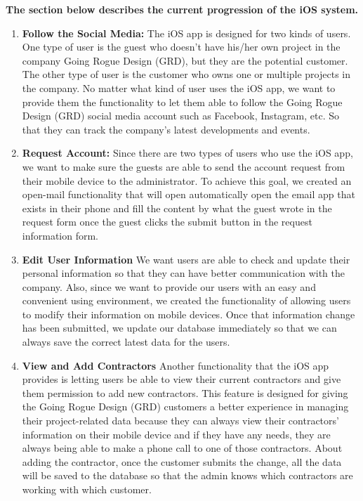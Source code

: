 \documentclass[onecolumn, draftclsnofoot,10pt, compsoc]{IEEEtran}
\begin{document}
\begin{flushleft}
\textbf{The section below describes the current progression of the iOS system.}

\end{flushleft}

\begin{enumerate}
  \item\textbf{ Follow the Social Media:}\newline
  The iOS app is designed for two kinds of users. One type of user is the guest who doesn't have his/her own project in the company Going Rogue Design (GRD), but they are the potential customer. The other type of user is the customer who owns one or multiple projects in the company. No matter what kind of user uses the iOS app, we want to provide them the functionality to let them able to follow the Going Rogue Design (GRD) social media account such as Facebook, Instagram, etc. So that they can track the company's latest developments and events.\newline
  \item \textbf{Request Account:}\newline
  Since there are two types of users who use the iOS app, we want to make sure the guests are able to send the account request from their mobile device to the administrator. To achieve this goal, we created an open-mail functionality that will open automatically open the email app that exists in their phone and fill the content by what the guest wrote in the request form once the guest clicks the submit button in the request information form.\newline
  
  
  \item \textbf{Edit User Information}\newline
  We want users are able to check and update their personal information so that they can have better communication with the company. Also, since we want to provide our users with an easy and convenient using environment, we created the functionality of allowing users to modify their information on mobile devices. Once that information change has been submitted, we update our database immediately so that we can always save the correct latest data for the users.\newline
  \item \textbf{View and Add Contractors}\newline
  Another functionality that the iOS app provides is letting users be able to view their current contractors and give them permission to add new contractors. This feature is designed for giving the Going Rogue Design (GRD) customers a better experience in managing their project-related data because they can always view their contractors' information on their mobile device and if they have any needs, they are always being able to make a phone call to one of those contractors. About adding the contractor, once the customer submits the change, all the data will be saved to the database so that the admin knows which contractors are working with which customer.\newline
  

\end{enumerate}
\end{document}
